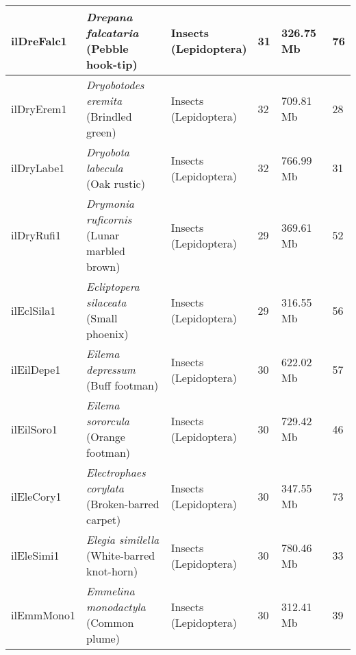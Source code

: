 \begin{centering}
\begin{longtable}{l|l|l|l|l|l}
ilDreFalc1 & \makecell[{l}]{\textit{Drepana falcataria} \\ (Pebble hook-tip)} & \makecell[{l}]{Insects \\ (Lepidoptera)} & 31 & 326.75 Mb & 76  \\ \hline
ilDryErem1 & \makecell[{l}]{\textit{Dryobotodes eremita} \\ (Brindled green)} & \makecell[{l}]{Insects \\ (Lepidoptera)} & 32 & 709.81 Mb & 28  \\ \hline
ilDryLabe1 & \makecell[{l}]{\textit{Dryobota labecula} \\ (Oak rustic)} & \makecell[{l}]{Insects \\ (Lepidoptera)} & 32 & 766.99 Mb & 31  \\ \hline
ilDryRufi1 & \makecell[{l}]{\textit{Drymonia ruficornis} \\ (Lunar marbled brown)} & \makecell[{l}]{Insects \\ (Lepidoptera)} & 29 & 369.61 Mb & 52  \\ \hline
ilEclSila1 & \makecell[{l}]{\textit{Ecliptopera silaceata} \\ (Small phoenix)} & \makecell[{l}]{Insects \\ (Lepidoptera)} & 29 & 316.55 Mb & 56  \\ \hline
ilEilDepe1 & \makecell[{l}]{\textit{Eilema depressum} \\ (Buff footman)} & \makecell[{l}]{Insects \\ (Lepidoptera)} & 30 & 622.02 Mb & 57  \\ \hline
ilEilSoro1 & \makecell[{l}]{\textit{Eilema sororcula} \\ (Orange footman)} & \makecell[{l}]{Insects \\ (Lepidoptera)} & 30 & 729.42 Mb & 46  \\ \hline
ilEleCory1 & \makecell[{l}]{\textit{Electrophaes corylata} \\ (Broken-barred carpet)} & \makecell[{l}]{Insects \\ (Lepidoptera)} & 30 & 347.55 Mb & 73  \\ \hline
ilEleSimi1 & \makecell[{l}]{\textit{Elegia similella} \\ (White-barred knot-horn)} & \makecell[{l}]{Insects \\ (Lepidoptera)} & 30 & 780.46 Mb & 33  \\ \hline
ilEmmMono1 & \makecell[{l}]{\textit{Emmelina monodactyla} \\ (Common plume)} & \makecell[{l}]{Insects \\ (Lepidoptera)} & 30 & 312.41 Mb & 39  \\ \hline

\end{longtable}
\end{centering}
